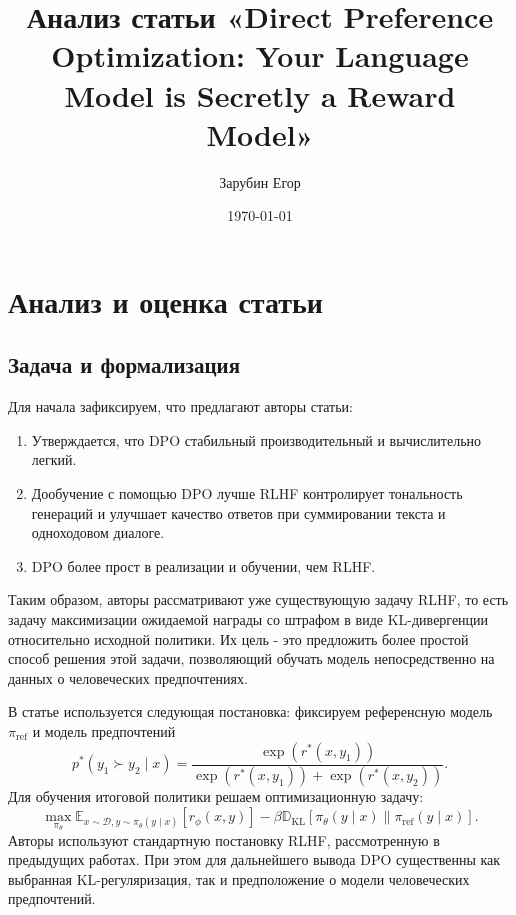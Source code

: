 \documentclass[11pt,a4paper]{article}
\title{\vspace{-1.5cm}\textbf{Анализ статьи «Direct Preference Optimization: Your Language Model is Secretly a Reward Model»}}
\author{Зарубин Егор}
\date{\today}
\theoremstyle{remark}
\begin{document}
\maketitle
\vspace{-0.8cm}

\section{Анализ и оценка статьи}

\subsection{Задача и формализация}
Для начала зафиксируем, что предлагают авторы статьи: 
\begin{enumerate}
     в обычном пайплайне RLHF, используемом в предыдущих работах и состоящем из трех этапов, заменить обучение отдельной модели награды и последующую RL-оптимизацию политики одним этапом обучения.
    \item Утверждается, что DPO стабильный производительный и вычислительно легкий.
    \item Дообучение с помощью DPO лучше RLHF контролирует тональность генераций и улучшает качество ответов при суммировании текста и одноходовом диалоге.
    \item DPO более прост в реализации и обучении, чем RLHF.
\end{enumerate}

Таким образом, авторы рассматривают уже существующую задачу RLHF, то есть задачу максимизации ожидаемой награды со штрафом в виде KL-дивергенции относительно исходной политики. Их цель - это предложить более простой способ решения этой задачи, позволяющий обучать модель непосредственно на данных о человеческих предпочтениях.

В статье используется следующая постановка: фиксируем референсную модель $\pi_{\text{ref}}$ и модель предпочтений 
$$p^*(y_1 \succ y_2 \mid x) = \frac{\exp (r^*(x, y_1))}{\exp (r^*(x, y_1)) + \exp (r^*(x, y_2))}.$$
Для обучения итоговой политики решаем оптимизационную задачу:
$$\max_{\pi_\theta} \mathbb{E}_{x \sim \mathcal{D}, y \sim \pi_\theta(y \mid x)} [r_\phi(x, y)] - \beta \mathbb{D}_{\text{KL}} [\pi_\theta(y \mid x) \parallel \pi_{\text{ref}}(y \mid x)].$$
Авторы используют стандартную постановку RLHF, рассмотренную в предыдущих работах. При этом для дальнейшего вывода DPO существенны как выбранная KL-регуляризация, так и предположение о модели человеческих предпочтений. 
\end{document}
